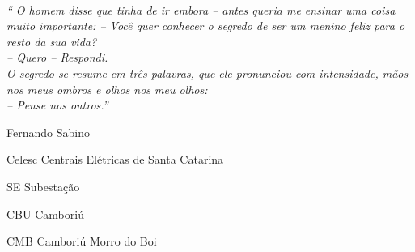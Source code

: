 \documentclass[a5paper]{ufsc-thesis}
\begin{document}
\begin{agradecimentos}
\lipsum[1]
\end{agradecimentos}

\begin{epigrafe}
    \vspace*{\fill}
		\noindent
		\hangindent=5cm \\
  \textit{`` O homem disse que tinha de ir embora -- antes queria me ensinar uma coisa muito importante: -- Você quer conhecer o segredo de ser um menino feliz para o resto da sua vida? \\ -- Quero -- Respondi. \\ O segredo se resume em três palavras, que ele pronunciou com intensidade, mãos nos meus ombros e olhos nos meu olhos: \\ -- Pense nos outros.''}
    \begin{flushright}
		Fernando Sabino	
		\end{flushright}		
\end{epigrafe}





 


\listoffigures
\cleardoublepage


\begin{siglas}
  \item[Celesc] Centrais Elétricas de Santa Catarina
  \item[SE] Subestação
  \item[CBU] Camboriú
  \item[CMB] Camboriú Morro do Boi
\end{siglas}
\end{document}
